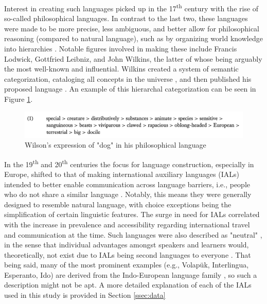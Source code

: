 \documentclass[12pt,a4paper]{article}
\numberwithin{figure}{section}
\numberwithin{table}{section}
\numberwithin{definition}{section}
\begin{document}
Interest in creating such languages picked up in the 17\textsuperscript{th} century with the rise of so-called philosophical languages. In contrast to the last two, these languages were made to be more precise, less ambiguous, and better allow for philosophical reasoning (compared to natural language), such as by organizing world knowledge into hierarchies \parencite{goodall2022article}. Notable figures involved in making these include Francis Lodwick, Gottfried Leibniz, and John Wilkins, the latter of whose being arguably the most well-known and influential. Wilkins created a system of semantic categorization, cataloging all concepts in the universe \parencite{okrent2009book}, and then published his proposed language \parencite{Wilkins1968book}. An example of this hierarchal categorization can be seen in Figure \ref{fig:wilsonslanguageexample}.


\begin{figure}
  \centering
        \includegraphics[width=1.0\textwidth]{WilsonsLanguageExample.png}
        \caption{Wilson's expression of "dog" in his philosophical language \parencite{goodall2022article}}
        \label{fig:wilsonslanguageexample}
\end{figure}


In the 19\textsuperscript{th} and 20\textsuperscript{th} centuries the focus for language construction, especially in Europe, shifted to that of making international auxiliary languages (IALs) intended to better enable communication across language barriers, i.e., people who do not share a similar language \parencite{goodall2022article}. Notably, this means they were generally designed to resemble natural language, with choice exceptions being the simplification of certain linguistic features. The surge in need for IALs correlated with the increase in prevalence and accessibility regarding international travel and communication at the time. Such languages were also described as "neutral" \parencite{Large1985book}, in the sense that individual advantages amongst speakers and learners would, theoretically, not exist due to IALs being second languages to everyone \parencite{Gobbo2016article}. That being said, many of the most prominent examples (e.g., Volapük, Interlingua, Esperanto, Ido) are derived from the Indo-European language family \parencite{Novikov2022article,goodall2022article}, so such a description might not be apt. A more detailed explanation of each of the IALs used in this study is provided in Section \ref{ssec:data}
\end{document}
